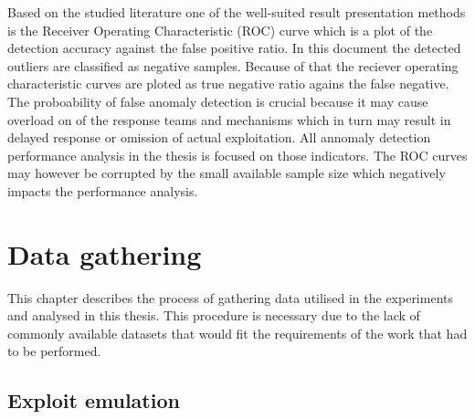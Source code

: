 \documentclass[a4paper,twoside,12pt]{book}
\begin{document}
Based on the studied literature one of the well-suited result presentation methods is the Receiver 
Operating Characteristic (ROC) curve which is a plot of the detection accuracy against the false 
positive ratio. In this document the detected outliers are classified as negative samples. Because 
of that the reciever operating characteristic curves are ploted as true negative ratio agains the 
false negative. The proboability of false anomaly detection is crucial because it may cause overload
on of the response teams and mechanisms which in turn may result in delayed response or omission
of actual exploitation. All annomaly detection performance analysis in the thesis is focused
on those indicators. The ROC curves may however be corrupted by the small available sample size 
which negatively impacts the performance analysis.



\chapter{Data gathering}

This chapter describes the process of gathering data utilised in the experiments and 
analysed in this thesis. This procedure is necessary due to the lack of commonly available 
datasets that would fit the requirements of the work that had to be performed. 

\section{Exploit emulation}
\end{document}

